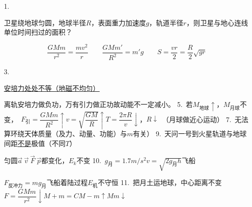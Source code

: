 1.
\begin{problem}
卫星绕地球匀圆，地球半径$R$，表面重力加速度$g$，轨道半径$r$，则卫星与地心连线单位时间扫过的面积？ %
\begin{solution}
\[
\frac{GMm}{r^2}=\frac{mv^2}{r}\qquad \frac{GMm'}{R^2}=m'g\qquad S=\frac{vr}{2}=\frac{R}{2}\sqrt{gr}
\]
\end{solution}
\end{problem}
3.

\underline{安培力处处不等（地磁不均匀）} %

离轨\quad 安培力做负功，万有引力做正功\quad 故动能不一定减小。
5.\ 若$M_{\text{地球}}\uparrow$，$M_{\text{月球}}$不变，\ $F_{\text{引}}=\dfrac{GMm}{R^2}\uparrow$\quad $v=\sqrt{\dfrac{GM}{R}}\uparrow$\quad $T=\dfrac{2\pi R}{v}\downarrow$，$R\downarrow$\ （月球做近心运动） %
7.\ 无法算环绕天体质量（及力、动量、功能）与$m$有关） %
9.\ 天问一号到火星轨道与地球间距\underline{不是}极值（不同$T$） %

匀圆\quad $\vec{a}\ \vec{v}\ \vec{F}\ \vec{p}$都变化，$E_k$不变
10.\ $g_{\text{月}}=1.7\unit{m/s^2}$\quad $v=\sqrt{2g_{\text{月}}h}$\quad 飞船

$F_{\text{反冲力}}=mg_{\text{月}}$\quad 飞船着陆过程$E_{\text{机}}$不守恒
11.\ 把月土运地球，中心距离不变\quad $F=\dfrac{GMm}{r^2}\downarrow$\quad $M+m=C$\quad $M-m\uparrow$\quad $Mm\downarrow$ %

